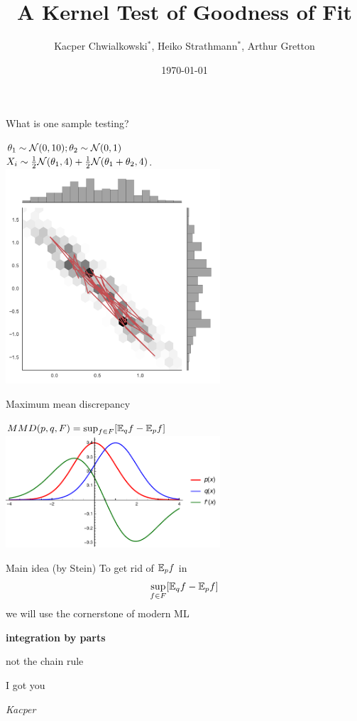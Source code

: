 \documentclass{beamer}
\title{ A Kernel Test of Goodness of Fit}
\date{\today}
\author{Kacper Chwialkowski$^*$, Heiko Strathmann$^*$, Arthur Gretton}
\institute{}
\begin{document}
\frame{\titlepage}
 \begin{frame}{What is one sample testing?}
 \begin{center}
$\theta_{1}\sim{\cal N}(0,10);\theta_{2}\sim{\cal N}(0,1)$\\
$ X_{i}\sim\frac{1}{2}{\cal N}(\theta_{1},4)+\frac{1}{2}{\cal N}(\theta_{1}+\theta_{2},4) $.
 \includegraphics[width=0.6\textwidth]{./img/sgld_sample_wth_trace.pdf} 
 \end{center}
 \end{frame}
 
 \begin{frame}{Maximum mean discrepancy}
 \begin{center}
$MMD(p,q,F) = \sup_{f \in F} [\mathbb{E}_{q}f - \mathbb{E}_{p} f]  $\\
\vspace{0.5cm}
 \includegraphics[width=0.6\textwidth]{./img/mmd.pdf} 
 \end{center}
 \end{frame} 
 
 
 
 \begin{frame}{Main idea (by Stein)}
To get rid of $\mathbb{E}_{p}f$  in $$ \sup_{f \in F} [\mathbb{E}_{q}f - \mathbb{E}_{p} f ] $$we will use the cornerstone of modern ML

\pause
\textbf{integration by parts}

\pause 
not the chain rule

\pause
I got you

\pause 
\begin{flushright}
\small \textit{Kacper} 
\end{flushright}



\end{frame} 
\end{document}

